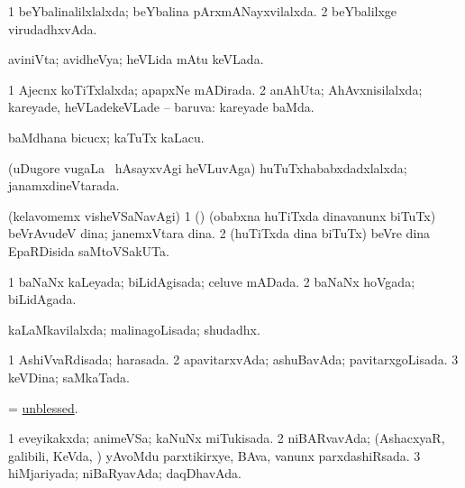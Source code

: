 \bentry
{} 
\gl{\gu}
\expl{}
\bmng
\bnum
\num{1} beYbalinalilxlalxda; beYbalina pArxmANayxvilalxda. 
\num{2} beYbalilxge virudadhxvAda. 
\enum
\emng
\eentry

\bentry
{} 
\gl{\gu}
\expl{}
\bmng
aviniVta; avidheVya; heVLida mAtu keVLada. 
\emng
\eentry

\bentry
{} 
\gl{\gu}
\expl{}
\bmng
\bnum
\num{1} Ajecnx koTiTxlalxda; apapxNe mADirada. 
\num{2} anAhUta; AhAvxnisilalxda; kareyade, heVLadekeVLade -- baruva:  kareyade baMda. 
\enum
\emng
\eentry

\bentry
{} 
\gl{\sakirx}
\bmng
baMdhana bicucx; kaTuTx kaLacu. 
\emng
\eentry

\bentry
{} 
\gl{\gu}
\expl{}
\bmng
(uDugore \mo vugaLa \vi\, hAsayxvAgi heVLuvAga) huTuTxhababxdadxlalxda; janamxdineVtarada. 
\emng
\eentry

\bentry
{} 
\gl{\nA}
\expl{}
\bmng
(kelavomemx visheVSaNavAgi) 
\bnum
\num{1} (\hA) (obabxna huTiTxda dinavanunx biTuTx) beVrAvudeV dina; janemxVtara dina. 
\num{2} (huTiTxda dina biTuTx) beVre dina EpaRDisida saMtoVSakUTa. 
\enum
\emng
\eentry

\bentry
{} 
\gl{\gu}
\expl{}
\bmng
\bnum
\num{1} baNaNx kaLeyada; biLidAgisada; celuve mADada. 
\num{2} baNaNx hoVgada; biLidAgada. 
\enum
\emng
\eentry

\bentry
{} 
\gl{\gu}
\expl{}
\bmng
kaLaMkavilalxda; malinagoLisada; shudadhx. 
\emng
\eentry

\bentry
{} 
\gl{\gu}
\expl{}
\bmng
\bnum
\num{1} AshiVvaRdisada; harasada. 
\num{2} apavitarxvAda; ashuBavAda; pavitarxgoLisada. 
\num{3} keVDina; saMkaTada. 
\enum
\emng
\eentry

\bentry
{} 
\gl{\gu}
\expl{}
\bmng
= \hyperlink{unblessed}{unblessed}. 
\emng
\eentry

\bentry
{} 
\gl{\gu}
\expl{}
\bmng
\bnum
\num{1} eveyikakxda; animeVSa; kaNuNx miTukisada. 
\num{2} niBARvavAda; (AshacxyaR, galibili, KeVda, \mo) yAvoMdu parxtikirxye, BAva, \mo vanunx parxdashiRsada. 
\num{3} hiMjariyada; niBaRyavAda; daqDhavAda. 
\enum
\emng
\eentry

